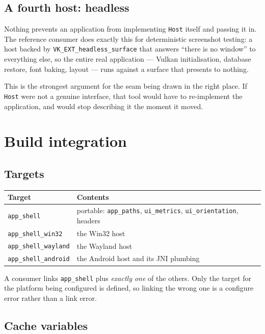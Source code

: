 \documentclass[11pt,a4paper]{article}
\begin{document}
\subsection{A fourth host: headless}

Nothing prevents an application from implementing \texttt{Host} itself and
passing it in. The reference consumer does exactly this for deterministic
screenshot testing: a host backed by \texttt{VK\_EXT\_headless\_surface} that
answers ``there is no window'' to everything else, so the entire real
application --- Vulkan initialisation, database restore, font baking, layout ---
runs against a surface that presents to nothing.

This is the strongest argument for the seam being drawn in the right place. If
\texttt{Host} were not a genuine interface, that tool would have to
re-implement the application, and would stop describing it the moment it moved.

\section{Build integration}

\subsection{Targets}

\begin{center}
\begin{tabular}{@{}ll@{}}
\toprule
Target & Contents \\
\midrule
\texttt{app\_shell}         & portable: \texttt{app\_paths}, \texttt{ui\_metrics}, \texttt{ui\_orientation}, headers \\
\texttt{app\_shell\_win32}   & the Win32 host \\
\texttt{app\_shell\_wayland} & the Wayland host \\
\texttt{app\_shell\_android} & the Android host and its JNI plumbing \\
\bottomrule
\end{tabular}
\end{center}

A consumer links \texttt{app\_shell} plus \emph{exactly one} of the others. Only
the target for the platform being configured is defined, so linking the wrong
one is a configure error rather than a link error.

\subsection{Cache variables}
\end{document}

